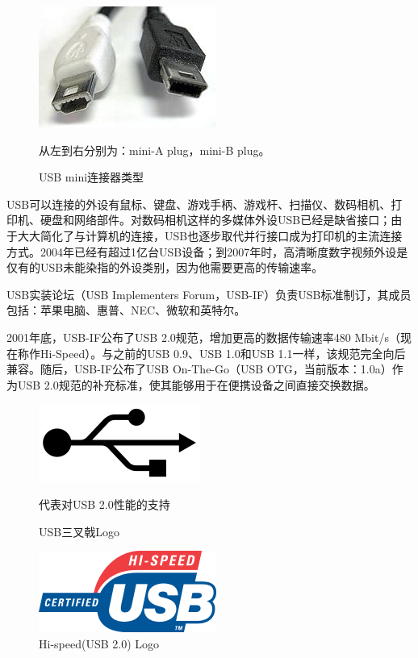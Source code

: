 \begin{figure}[ht]
	\begin{center}
		\includegraphics[keepaspectratio,width=0.5\paperwidth]{Hardwares/Mini_usb_AB.jpg}
	\caption{USB mini连接器类型}
	从左到右分别为：mini-A plug，mini-B plug。
	\label{fig:USBconnectors}
	\end{center}
\end{figure}

USB可以连接的外设有鼠标、键盘、游戏手柄、游戏杆、扫描仪、数码相机、打印机、硬盘和网络部件。对数码相机这样的多媒体外设USB已经是缺省接口；由于大大简化了与计算机的连接，USB也逐步取代并行接口成为打印机的主流连接方式。2004年已经有超过1亿台USB设备；到2007年时，高清晰度数字视频外设是仅有的USB未能染指的外设类别，因为他需要更高的传输速率。


USB实装论坛（USB Implementers Forum，USB-IF）负责USB标准制订，其成员包括：苹果电脑、惠普、NEC、微软和英特尔。

2001年底，USB-IF公布了USB 2.0规范，增加更高的数据传输速率480 Mbit/s（现在称作Hi-Speed）。与之前的USB 0.9、USB 1.0和USB 1.1一样，该规范完全向后兼容。随后，USB-IF公布了USB On-The-Go（USB OTG，当前版本：1.0a）作为USB 2.0规范的补充标准，使其能够用于在便携设备之间直接交换数据。

\begin{figure}[ht]
	\begin{center}
		\includegraphics[keepaspectratio,width=0.5\paperwidth]{Hardwares/usb-logo.png}
	\caption{USB三叉戟Logo}
	代表对USB 2.0性能的支持
	\label{fig:usb-trident-logo}
	\end{center}
\end{figure}

\begin{figure}[ht]
	\begin{center}
		\includegraphics[keepaspectratio,width=0.5\paperwidth]{Hardwares/usb-hi-speed-logo.png}
	\caption{Hi-speed(USB 2.0) Logo}
	\label{fig:usb-high-speed-logo}
	\end{center}
\end{figure}

